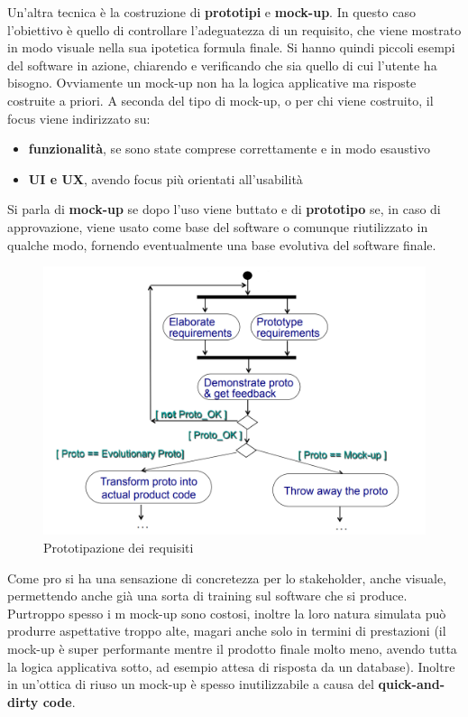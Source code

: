 Un'altra tecnica è la costruzione di \textbf{prototipi} e \textbf{mock-up}. In questo caso l'obiettivo è quello di controllare l'adeguatezza di un requisito, che viene mostrato in modo visuale nella sua ipotetica formula finale. Si hanno quindi piccoli esempi del software in azione, chiarendo e verificando che sia quello di cui l'utente ha bisogno. Ovviamente un mock-up non ha la logica applicative ma risposte costruite a priori. A seconda del tipo di mock-up, o per chi viene costruito, il focus viene indirizzato su: 
\begin{itemize}
  \item \textbf{funzionalità}, se sono state comprese correttamente e in modo esaustivo
  \item \textbf{UI e UX}, avendo focus più orientati all'usabilità 
\end{itemize}
Si parla di \textbf{mock-up} se dopo l'uso viene buttato e di \textbf{prototipo} se, in caso di approvazione, viene usato come base del software o comunque riutilizzato in qualche modo, fornendo eventualmente una base evolutiva del software finale.\\
\begin{figure}[H]
    \centering
    \includegraphics[scale = 0.5]{Imm/flowchartr.PNG}
    \caption{Prototipazione dei requisiti}
\end{figure}
Come pro si ha una sensazione di concretezza per lo stakeholder, anche visuale, permettendo anche già una sorta di training sul software che si produce. Purtroppo spesso i m mock-up sono costosi, inoltre la loro natura simulata può produrre aspettative troppo alte, magari anche solo in termini di prestazioni (il mock-up è super performante mentre il prodotto finale molto meno, avendo tutta la logica applicativa sotto, ad esempio attesa di risposta da un database). Inoltre in un'ottica di riuso un mock-up è spesso inutilizzabile a causa del \textbf{quick-and-dirty code}.

